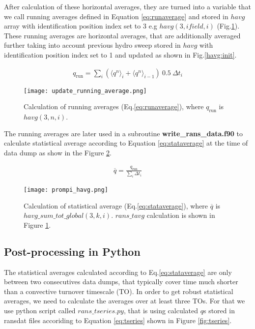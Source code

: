 \documentclass[11pt,paper=a4]{report}
\begin{document}
After calculation of these horizontal averages, they are turned into a variable that we call running averages defined in Equation \ref{eq:runaverage} and stored in $havg$ array with identification position index set to 3 e.g $havg(3,ifield,i)$ (Fig.\ref{fig:runaverage}). These running averages are horizontal averages, that are additionally averaged further taking into account previous hydro sweep stored in $havg$ with identification position index set to 1 and updated as shown in Fig.\ref{havg:init}. 

\begin{align}
  q_{\mbox{run}} = \sum_i \left(\langle q^n \rangle_i + \langle q^n \rangle_{i-1} \right) \ 0.5 \ \Delta t_i
\label{eq:runaverage}  
\end{align}  

\begin{figure}[!h]
\centerline{
\texttt{[image: update\_running\_average.png]}}
\caption{Calculation of running averages (Eq.\ref{eq:runaverage}), where $q_{\mbox{run}}$ is $havg(3,n,i)$.}
\label{fig:runaverage}
\end{figure}

The running averages are later used in a subroutine {\bf write\_rans\_data.f90} to calculate statistical average according to Equation \ref{eq:stataverage} at the time of data dump as show in the Figure \ref{fig:stataverage}.  

\begin{align}
  \overline{q} =  \frac{q_{\mbox{run}}}{\sum_i \Delta t_i}
\label{eq:stataverage}  
\end{align}  

\begin{figure}[!h]
\centerline{
\texttt{[image: prompi\_havg.png]}}
\caption{Calculation of statistical average (Eq.\ref{eq:stataverage}), where $\overline{q}$ is $havg\_sum\_tot\_global(3,k,i)$. $rans\_tavg$ calculation is shown in Figure \ref{fig:runaverage}.}
\label{fig:stataverage}
\end{figure}


\subsection{Post-processing in Python}

The statistical averages calculated according to Eq.\ref{eq:stataverage} are only between two consecutives data dumps, that typically cover time much shorter than a convective turnover timescale (TO). In order to get robust statistical averages, we need to calculate the averages over at least three TOs. For that we use python script called $rans\_tseries.py$, that is using calculated $q$s stored in ransdat files accoriding to Equation \ref{eq:tseries} shown in Figure \ref{fig:tseries}. 
\end{document}
